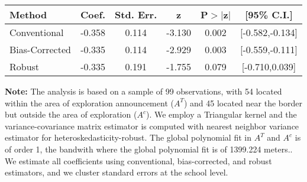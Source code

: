 \begin{table}[htbp]\centering
 \footnotesize 
\begin{tabular}{lccccc}
\hline\hline
Method & Coef. & Std. Err. & z & P$>|$z$|$ & [95\% C.I.] \\ 
\hline \hline  
Conventional & -0.358 & 0.114 & -3.130 & 0.002 & [-0.582,-0.134] \\ 
 Bias-Corrected & -0.335 & 0.114 & -2.929 & 0.003 & [-0.559,-0.111] \\ 
Robust & -0.335 & 0.191 & -1.755 & 0.079 & [-0.710,0.039] \\ 
  \hline\hline
\end{tabular}
\label{table:rd}
\begin{tablenotes} 
  \justifying \tiny \textbf{Note: }    
   The analysis is based on a sample of 99 observations, with 54 located within the area of exploration announcement ($A^{T}$) and 45 located near the border but outside the area of exploration  ($A^{c}$). 
           We employ a Triangular kernel and the variance-covariance matrix estimator is computed with nearest neighbor variance estimator for heteroskedasticity-robust. The global polynomial fit in  $A^{T}$ and $A^{c}$ is of order 1, the bandwith where the global polynomial fit is of 1399.224 meters.. We estimate all coefficients using conventional, bias-corrected, and robust estimators, and we cluster standard errors at the school level. \end{tablenotes} 
 \end{table} 
